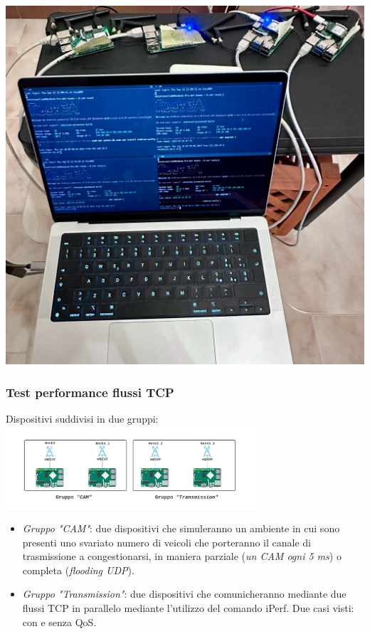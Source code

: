 \documentclass{beamer}
\begin{document}
\begin{frame}
\begin{minipage}{0.35\textwidth}
        \includegraphics[width=\textwidth]{topology_photo.jpg}
    \end{minipage}
\end{frame}

\begin{frame}
    \frametitle{Test performance flussi TCP}
    Dispositivi suddivisi in due gruppi:
    \centering
    \includegraphics[width=0.7\textwidth]{Rock scheme.png}
    \begin{itemize}
        \item \textit{Gruppo "CAM"}: due dispositivi che simuleranno un ambiente in cui sono presenti uno svariato numero di veicoli che porteranno il canale di trasmissione a congestionarsi, in maniera parziale (\textit{un CAM ogni 5 ms}) o completa (\textit{flooding UDP}).
        \item \textit{Gruppo "Transmission"}: due dispositivi che comunicheranno mediante due flussi TCP in parallelo mediante l'utilizzo del comando iPerf. Due casi visti: con e senza QoS.
    \end{itemize}
\end{frame}
\end{document}
